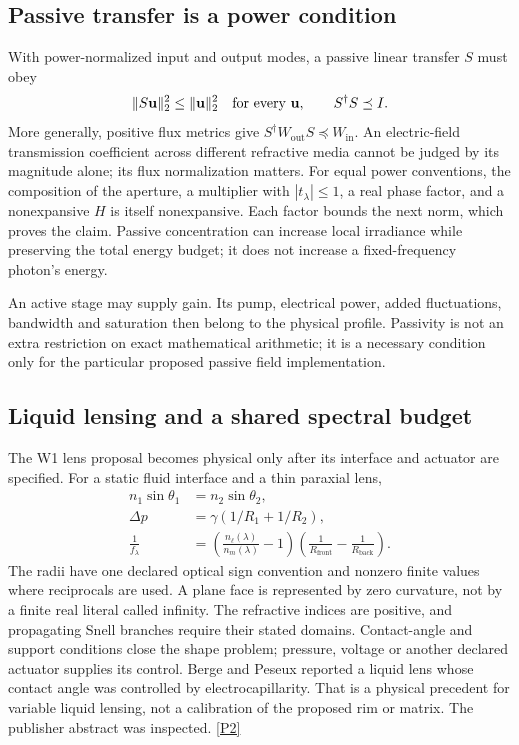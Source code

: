 \subsection{Passive transfer is a power condition}

With power-normalized input and output modes, a passive linear transfer $S$
must obey
\begin{equation}
 \|S\mathbf u\|_2^2\le\|\mathbf u\|_2^2
 \quad\hbox{for every }\mathbf u,
 \qquad S^\dagger S\preceq I.
 \label{eq:want-passive}
\end{equation}
More generally, positive flux metrics give
$S^\dagger W_{\mathrm{out}}S\preceq W_{\mathrm{in}}$.
An electric-field transmission coefficient across different refractive media
cannot be judged by its magnitude alone; its flux normalization matters.
For equal power conventions, the composition of the aperture, a multiplier
with $|t_\lambda|\le1$, a real phase factor, and a nonexpansive $H$ is itself
nonexpansive. Each factor bounds the next norm, which proves the claim.
Passive concentration can increase local irradiance while preserving the total
energy budget; it does not increase a fixed-frequency photon's energy.

An active stage may supply gain. Its pump, electrical power, added fluctuations,
bandwidth and saturation then belong to the physical profile. Passivity is not
an extra restriction on exact mathematical arithmetic; it is a necessary
condition only for the particular proposed passive field implementation.

\subsection{Liquid lensing and a shared spectral budget}

The W1 lens proposal becomes physical only after its interface and actuator are
specified. For a static fluid interface and a thin paraxial lens,
\begin{align}
 n_1\sin\theta_1&=n_2\sin\theta_2,\\
 \Delta p&=\gamma(1/R_1+1/R_2),\\
 \frac1{f_\lambda}
 &=\left(\frac{n_\ell(\lambda)}{n_m(\lambda)}-1\right)
   \left(\frac1{R_{\mathrm{front}}}-\frac1{R_{\mathrm{back}}}\right).
 \label{eq:want-lens}
\end{align}
The radii have one declared optical sign convention and nonzero finite values
where reciprocals are used. A plane face is represented by zero curvature,
not by a finite real literal called infinity. The refractive indices are
positive, and propagating Snell branches require their stated domains.
Contact-angle and support
conditions close the shape problem; pressure, voltage or another declared
actuator supplies its control. Berge and Peseux reported a liquid lens whose
contact angle was controlled by electrocapillarity. That is a physical
precedent for variable liquid lensing, not a calibration of the proposed rim
or matrix. The publisher abstract was inspected.
\href{https://link.springer.com/article/10.1007/s101890070029}{[P2]}

